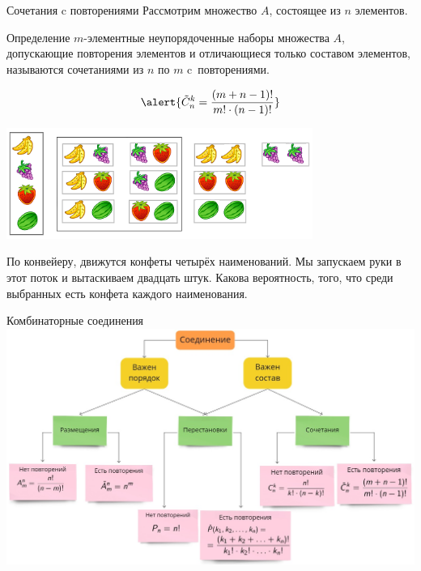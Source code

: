 \documentclass[unicode,11pt,notheorems,xcolor=table]{beamer}
\begin{document}
\begin{frame}{Сочетания c повторениями}
    Рассмотрим множество $A$, состоящее из $n$ элементов.
    
    \begin{block}{Определение}
        $m$-элементные неупорядоченные наборы множества $A$, допускающие повторения элементов и отличающиеся только составом элементов, называются \alert{сочетаниями из $n$ по $m$ c~повторениями}. 
    \end{block}
        $$
        \alert{\tilde{C}_n^k=\frac{(m+n-1)!}{m!\cdot (n-1)!}}
    $$
    {\centering \includegraphics[width=0.75\textwidth]{combinations-2.png}\par}


\end{frame}
\begin{frame}{}
    \begin{exampleblock}{}
        По конвейеру, движутся конфеты четырёх наименований. Мы запускаем руки в этот поток и вытаскиваем двадцать штук. Какова вероятность, того, что среди выбранных есть конфета каждого наименования.
    \end{exampleblock}
\end{frame}
\begin{frame}{Комбинаторные соединения}{}
    \centering \includegraphics[width=1.05\textwidth]{diagram.png}\par
\end{frame}
\end{document}
